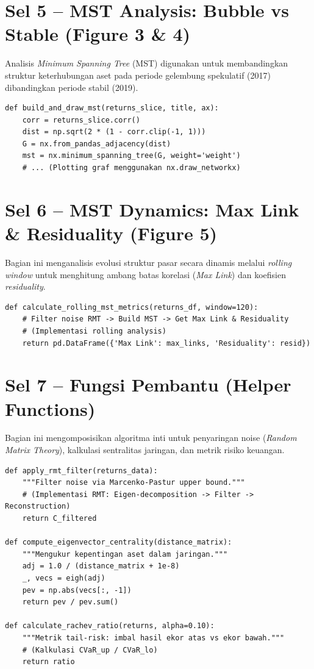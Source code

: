\documentclass[12pt,a4paper]{article}
\begin{document}
\section{Sel 5 -- MST Analysis: Bubble vs Stable (Figure 3 \& 4)}
Analisis \textit{Minimum Spanning Tree} (MST) digunakan untuk membandingkan struktur keterhubungan aset pada periode gelembung spekulatif (2017) dibandingkan periode stabil (2019).

\begin{lstlisting}[caption={Konstruksi MST antar periode}]
def build_and_draw_mst(returns_slice, title, ax):
    corr = returns_slice.corr()
    dist = np.sqrt(2 * (1 - corr.clip(-1, 1)))
    G = nx.from_pandas_adjacency(dist)
    mst = nx.minimum_spanning_tree(G, weight='weight')
    # ... (Plotting graf menggunakan nx.draw_networkx)
\end{lstlisting}

\section{Sel 6 -- MST Dynamics: Max Link \& Residuality (Figure 5)}
Bagian ini menganalisis evolusi struktur pasar secara dinamis melalui \textit{rolling window} untuk menghitung ambang batas korelasi (\textit{Max Link}) dan koefisien \textit{residuality}.

\begin{lstlisting}[caption={Kalkulasi dinamika MST sepanjang waktu}]
def calculate_rolling_mst_metrics(returns_df, window=120):
    # Filter noise RMT -> Build MST -> Get Max Link & Residuality
    # (Implementasi rolling analysis)
    return pd.DataFrame({'Max Link': max_links, 'Residuality': resid})
\end{lstlisting}

\section{Sel 7 -- Fungsi Pembantu (Helper Functions)}
Bagian ini mengomposisikan algoritma inti untuk penyaringan noise (\textit{Random Matrix Theory}), kalkulasi sentralitas jaringan, dan metrik risiko keuangan.

\begin{lstlisting}[caption={Kalkulasi Network dan Risiko}]
def apply_rmt_filter(returns_data):
    """Filter noise via Marcenko-Pastur upper bound."""
    # (Implementasi RMT: Eigen-decomposition -> Filter -> Reconstruction)
    return C_filtered

def compute_eigenvector_centrality(distance_matrix):
    """Mengukur kepentingan aset dalam jaringan."""
    adj = 1.0 / (distance_matrix + 1e-8)
    _, vecs = eigh(adj)
    pev = np.abs(vecs[:, -1])
    return pev / pev.sum()

def calculate_rachev_ratio(returns, alpha=0.10):
    """Metrik tail-risk: imbal hasil ekor atas vs ekor bawah."""
    # (Kalkulasi CVaR_up / CVaR_lo)
    return ratio
\end{lstlisting}
\end{document}
